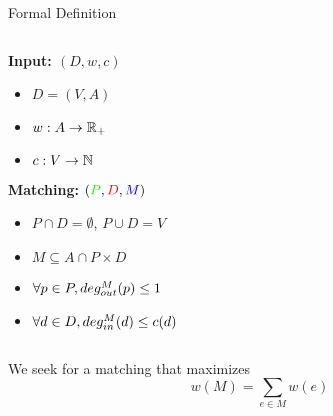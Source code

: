 \begin{frame}{Formal Definition}
\begin{columns}

\begin{column}{.45\textwidth}
\textbf{Input: $(D, w, c)$}
\begin{itemize}
\item $D=(V,A)$
\item $w:A \to \mathbb{R}_+$
\item $c:V \to \mathbb{N}$
\end{itemize}

\textbf{Matching:} $({\color{green} P}, {\color{red} D}, {\color{blue} M})$

\begin{itemize}
\item $P \cap D = \emptyset$, $P \cup D = V$
\item $M \subseteq A \cap P \times D$
\item $\forall p \in P, deg^M_{out}(p) \leq 1$
\item $\forall d \in D, deg^M_{in}(d) \leq c(d)$
\end{itemize}
\end{column}

\begin{column}{.55\textwidth}
\centering

\end{column}
\end{columns}

\vfill
We seek for a matching that maximizes
$$w(M) = \sum_{e \in M}{w(e)}$$

\end{frame}